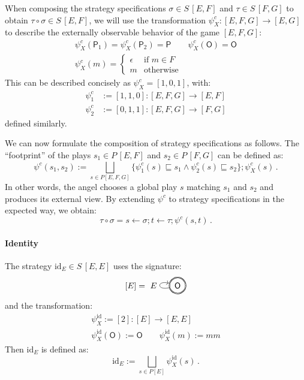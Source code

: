 \documentclass[sigplan,screen]{acmart}
\newcommand{\kw}[1]{\ensuremath{ \mathsf{#1} }}
\begin{document}
When composing the strategy specifications
$\sigma \in S \, [E, F]$ and
$\tau \in S \, [F, G]$
to obtain $\tau \circ \sigma \in S \, [E, F]$,
we will use the transformation
$\psi^c_X : [E,F,G] \rightarrow [E,G]$
to describe the externally observable behavior
of the game $[E,F,G]$:
\begin{gather*}
  \psi^c_X(\kw{P}_1) = \psi^c_X(\kw{P}_2) = \kw{P} \qquad
  \psi^c_X(\kw{O}) = \kw{O}
  \\
  \psi^c_X(m) = \begin{cases}
    \epsilon & \text{if } m \in F \\
    m & \text{otherwise}
  \end{cases}
\end{gather*}
This can be described concisely as
$\psi^c_X = [1,0,1]$,
with:
\begin{align*}
  \psi^c_1 &:= [1,1,0] :
    [E,F,G] \rightarrow [E,F] \\
  \psi^c_2 &:= [0,1,1] :
     [E,F,G] \rightarrow [F,G]
\end{align*}
defined similarly.

We can now formulate the composition of strategy specifications as follows.
The ``footprint'' of the plays $s_1 \in P \, [E,F]$ and $s_2 \in P \, [F,G]$
can be defined as:
\[
  \psi^c(s_1, s_2) :=
    \bigsqcup_{s \in P [E,F,G]}
    \{ \psi^c_1(s) \sqsubseteq s_1 \wedge \psi^c_2(s) \sqsubseteq s_2 \} ;
    \psi^c_X(s) \,.
\]
In other words,
the angel chooses a global play $s$
matching $s_1$ and $s_2$
and produces its external view.
By extending $\psi^c$ to strategy specifications
in the expected way, we obtain:
\[
  \tau \circ \sigma = 
    s \leftarrow \sigma ;
    t \leftarrow \tau ;
    \psi^c(s, t) \,.
\]


\paragraph{Identity} %

The strategy $\mathrm{id}_E \in S \, [E,E]$
uses the signature:
\[
  [E] =
  \begin{tikzpicture}[baseline=(O.base)]
    \node[circle,draw,double] (O) at (0,0) {$\kw{O}$};
    \path[->] (O) edge[loop left] node[auto] {$E$} (O);
  \end{tikzpicture}
\]
and the transformation:
\begin{gather*}
  \psi^\mathrm{id}_X := [2] : [E] \rightarrow [E,E] \\
  \psi^\mathrm{id}_X(\kw{O}) := \kw{O} \qquad
  \psi^\mathrm{id}_X(m) := mm
\end{gather*}
Then $\mathrm{id}_E$ is defined as:
\[
  \mathrm{id}_E :=
    \bigsqcup_{s \in P [E]} \psi^\mathrm{id}_X(s) \,.
\]
\end{document}
